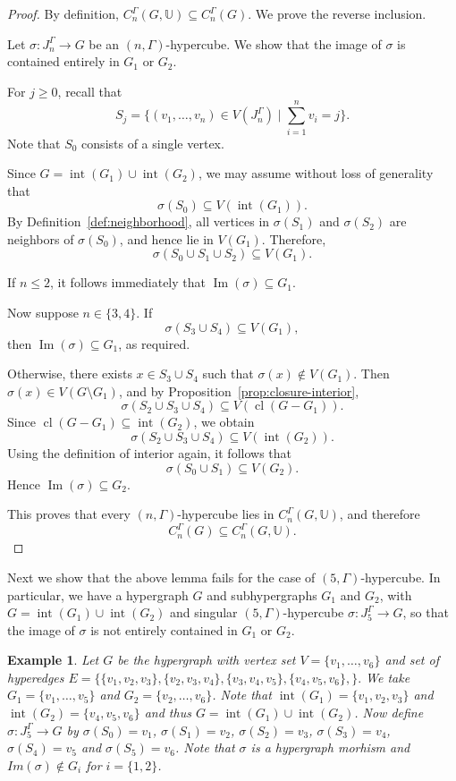 \documentclass[11pt]{amsart}
\newtheorem{ex}[subsection]{Example}
\newcommand{\cl}{\operatorname{cl}}
\renewcommand{\int}{\operatorname{int}}
\begin{document}
\begin{proof}
By definition, $C_n^\Gamma(G,\mathbb{U}) \subseteq C_n^\Gamma(G)$. We prove the reverse inclusion.

Let $\sigma : J_n^\Gamma \to G$ be an $(n,\Gamma)$-hypercube. We show that the image of $\sigma$ is contained entirely in $G_1$ or $G_2$.

For $j \ge 0$, recall that
\[
S_j = \{(v_1,\dots,v_n) \in V(J_n^\Gamma) \mid \textstyle\sum_{i=1}^n v_i = j\}.
\]
Note that $S_0$ consists of a single vertex.

Since $G = \int(G_1) \cup \int(G_2)$, we may assume without loss of generality that
\[
\sigma(S_0) \subseteq V(\int(G_1)).
\]
By Definition~\ref{def:neighborhood}, all vertices in $\sigma(S_1)$ and $\sigma(S_2)$ are neighbors of $\sigma(S_0)$, and hence lie in $V(G_1)$. Therefore,
\[
\sigma(S_0 \cup S_1 \cup S_2) \subseteq V(G_1).
\]

If $n \le 2$, it follows immediately that $\operatorname{Im}(\sigma) \subseteq G_1$.

Now suppose $n \in \{3,4\}$. If
\[
\sigma(S_3 \cup S_4) \subseteq V(G_1),
\]
then $\operatorname{Im}(\sigma) \subseteq G_1$, as required.

Otherwise, there exists $x \in S_3 \cup S_4$ such that $\sigma(x) \notin V(G_1)$. Then $\sigma(x) \in V(G \setminus G_1)$, and by Proposition~\ref{prop:closure-interior},
\[
\sigma(S_2 \cup S_3 \cup S_4) \subseteq V(\cl(G - G_1)).
\]
Since $\cl(G - G_1) \subseteq \int(G_2)$, we obtain
\[
\sigma(S_2 \cup S_3 \cup S_4) \subseteq V(\int(G_2)).
\]
Using the definition of interior again, it follows that
\[
\sigma(S_0 \cup S_1) \subseteq V(G_2).
\]
Hence $\operatorname{Im}(\sigma) \subseteq G_2$.

This proves that every $(n,\Gamma)$-hypercube lies in $C_n^\Gamma(G,\mathbb{U})$, and therefore
\[
C_n^\Gamma(G) \subseteq C_n^\Gamma(G,\mathbb{U}).
\]
\end{proof}

Next we show that the above lemma fails for the case of  $(5,\Gamma)$-hypercube. In particular, we have a hypergraph $G$ and subhypergraphs $G_1$ and $G_2$, 
with $G=\int(G_1)\cup \int(G_2)$ and singular $(5,\Gamma)$-hypercube $\sigma:J_5^\Gamma\to G$, so that the image of $\sigma$ is not entirely contained in $G_1$ or $G_2$.
\begin{ex}
	
	Let $G$ be the hypergraph with vertex set $V=\{v_1,\ldots, v_{6}\}$ and set of hyperedges $E=\{\{v_1,v_2,v_3\}, \{v_2, v_3,v_4\},\{v_3,v_4,v_5\}, \{v_4,v_5,v_6\},\}.$ We take $G_1=\{v_1,\ldots, v_5\}$ and $G_2=\{v_2,\ldots, v_{6}\}$. Note that $\int(G_1)=\{v_1,v_2,v_3\}$ and $\int(G_2)=\{v_4,v_5,v_{6}\}$ and thus $G=\int(G_1)\cup \int(G_2)$. Now define $\sigma: J_5^\Gamma\rightarrow G$ by $\sigma(S_0)=v_1$, $\sigma(S_1)=v_2$, $\sigma(S_2)=v_3$, $\sigma(S_3)=v_4$, $\sigma(S_4)=v_5$ and $\sigma(S_5)=v_{6}$. Note that $\sigma $ is a hypergraph morhism and $Im(\sigma) \notin G_i$ for $i=\{1,2\}$. 
\end{ex}
\end{document}
